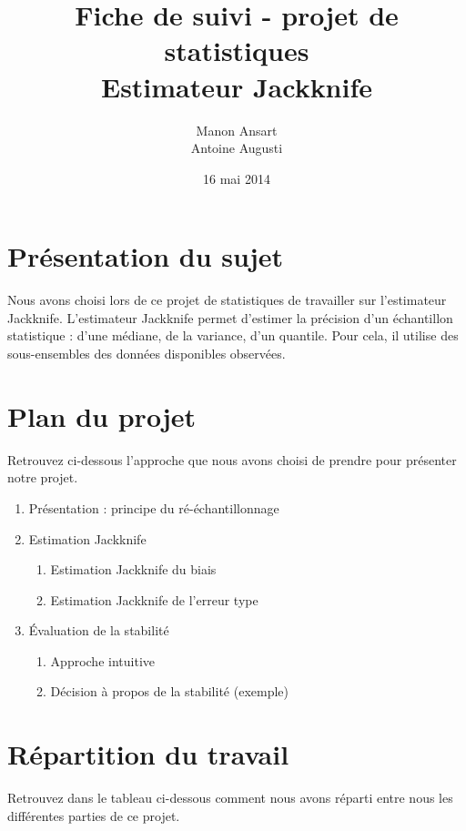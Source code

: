 \documentclass[a4paper,10pt]{article}
\title {Fiche de suivi - projet de statistiques\\ Estimateur Jackknife}
\author{Manon Ansart\\ Antoine Augusti}
\date{16 mai 2014}
\begin{document}
	\maketitle

	\section{Présentation du sujet}
	Nous avons choisi lors de ce projet de statistiques de travailler sur l'estimateur Jackknife. L'estimateur Jackknife permet d'estimer la précision d'un échantillon statistique : d'une médiane, de la variance, d'un quantile. Pour cela, il utilise des sous-ensembles des données disponibles observées.

	\section{Plan du projet}
	Retrouvez ci-dessous l'approche que nous avons choisi de prendre pour présenter notre projet.
	
	\vspace{10px}
	\begin{enumerate}
		\item Présentation : principe du ré-échantillonnage
		\item Estimation Jackknife
		\begin{enumerate}
			\item Estimation Jackknife du biais 
			\item Estimation Jackknife de l'erreur type 
		\end{enumerate}
		\item Évaluation de la stabilité
		\begin{enumerate}
			\item Approche intuitive
			\item Décision à propos de la stabilité (exemple) 
		\end{enumerate}
	\end{enumerate}


	\section{Répartition du travail}
	Retrouvez dans le tableau ci-dessous comment nous avons réparti entre nous les différentes parties de ce projet.
	
\end{document}
